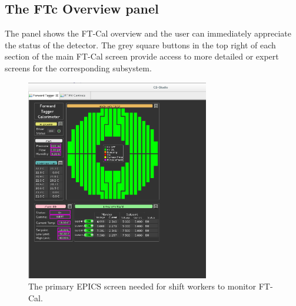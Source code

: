 \documentclass[11.5pt]{article}
\begin{document}
\subsection{The FTc Overview panel}\label{sec:ft-epics}
The panel shows the FT-Cal overview and the user can immediately appreciate the status of the detector. The grey square buttons in the top right of each section of the main FT-Cal screen provide
access to more detailed or expert screens for the corresponding subsystem.
\begin{figure}[ht]\centering
    \includegraphics[width=8cm]{pics/All_Working_HVs.png}
    \caption{The primary EPICS screen needed for shift workers to monitor FT-Cal.\label{fig:ecal_all}}
\end{figure}
\end{document}
